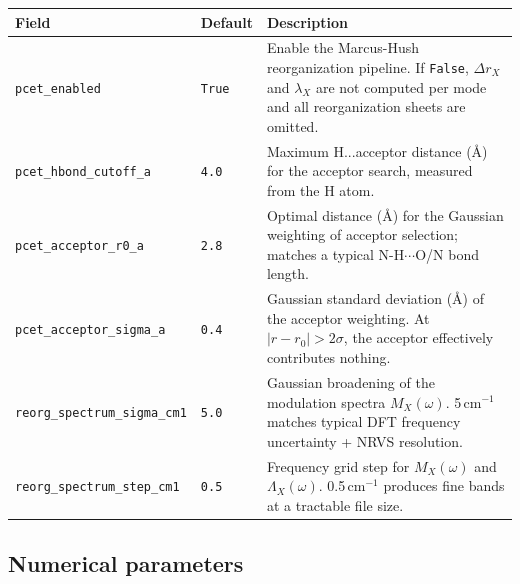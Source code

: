 \documentclass[11pt,a4paper,twoside]{article}
\theoremstyle{remark}
\begin{document}
\begin{longtable}{p{} p{} p{}}
\toprule
\textbf{Field} & \textbf{Default} & \textbf{Description} \\
\midrule
\endhead
\texttt{pcet\_enabled} & \texttt{True} & Enable the Marcus-Hush
  reorganization pipeline. If \texttt{False}, $\Delta r_X$ and
  $\lambda_X$ are not computed per mode and all reorganization
  sheets are omitted. \\
\texttt{pcet\_hbond\_cutoff\_a} & \texttt{4.0} & Maximum
  H...acceptor distance (\AA{}) for the acceptor search,
  measured from the H atom. \\
\texttt{pcet\_acceptor\_r0\_a} & \texttt{2.8} & Optimal distance
  (\AA{}) for the Gaussian weighting of acceptor selection;
  matches a typical N-H$\cdots$O/N bond length. \\
\texttt{pcet\_acceptor\_sigma\_a} & \texttt{0.4} & Gaussian
  standard deviation (\AA{}) of the acceptor weighting.
  At $|r - r_0| > 2\sigma$, the acceptor effectively contributes
  nothing. \\
\texttt{reorg\_spectrum\_sigma\_cm1} & \texttt{5.0} & Gaussian
  broadening of the modulation spectra $M_X(\omega)$.
  5\,cm$^{-1}$ matches typical DFT frequency uncertainty +
  NRVS resolution. \\
\texttt{reorg\_spectrum\_step\_cm1} & \texttt{0.5} & Frequency
  grid step for $M_X(\omega)$ and $\Lambda_X(\omega)$.
  0.5\,cm$^{-1}$ produces fine bands at a tractable file size. \\
\bottomrule
\end{longtable}

\subsection{Numerical parameters}
\end{document}
